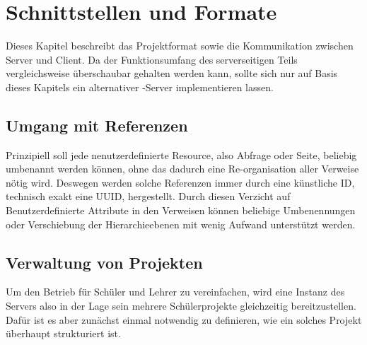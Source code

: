 \section{Schnittstellen und Formate}

Dieses Kapitel beschreibt das Projektformat sowie die Kommunikation zwischen Server und Client. Da der Funktionsumfang des serverseitigen Teils vergleichsweise überschaubar gehalten werden kann, sollte sich nur auf Basis dieses Kapitels ein alternativer \idename-Server implementieren lassen.

\subsection{Umgang mit Referenzen}

Prinzipiell soll jede nenutzerdefinierte Resource, also Abfrage oder Seite, beliebig umbenannt werden können, ohne das dadurch eine Re-organisation aller Verweise nötig wird. Deswegen werden solche Referenzen immer durch eine künstliche ID, technisch exakt eine UUID, hergestellt. Durch diesen Verzicht auf Benutzerdefinierte Attribute in den Verweisen können beliebige Umbenennungen oder Verschiebung der Hierarchieebenen mit wenig Aufwand unterstützt werden.

\subsection{Verwaltung von Projekten}

Um den Betrieb für Schüler und Lehrer zu vereinfachen, wird eine Instanz des Servers also in der Lage sein mehrere Schülerprojekte gleichzeitig bereitzustellen. Dafür ist es aber zunächst einmal notwendig zu definieren, wie ein solches Projekt überhaupt strukturiert ist.



